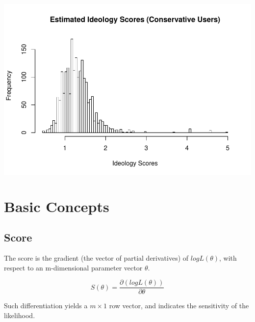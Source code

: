 \documentclass[]{book}
\begin{document}
\includegraphics{bookdown-demo_files/figure-latex/unnamed-chunk-23-3.pdf}

\chapter{Basic Concepts}\label{basic-concepts}

\section{Score}\label{score}

The score is the gradient (the vector of partial derivatives) of
\(log L(\theta)\), with respect to an m-dimensional parameter vector
\(\theta\).

\[S(\theta) = \frac{\partial (log L(\theta))}{\partial \theta}\]

Such differentiation yields a \(m\times 1\) row vector, and indicates
the sensitivity of the likelihood.


\end{document}
